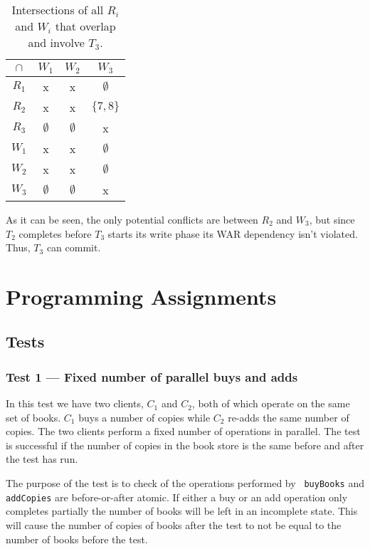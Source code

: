 \documentclass[11pt,a4paper,english]{article}
\begin{document}
\begin{table}[!hbt]
\centering
\begin{tabular}{|c|c|c|c|}
\hline
$\cap$  & $W_{1}$ & $W_{2}$ & $W_{3}$    \\ \hline
$R_{1}$ & x  & x  & $\emptyset$ \\ \hline
$R_{2}$ & x  & x  & $\{7,8\}$ \\ \hline
$R_{3}$ & $\emptyset$ & $\emptyset$ & x \\ \hline
$W_{1}$ & x  & x  & $\emptyset$ \\ \hline
$W_{2}$ & x  & x  & $\emptyset$ \\ \hline
$W_{3}$ & $\emptyset$ & $\emptyset$ & x \\ \hline
\end{tabular}
\caption{Intersections of all $R_{i}$ and $W_{i}$ that overlap and involve $T_{3}$.}
\label{tbl:scenario3}
\end{table}

As it can be seen, the only potential conflicts are between $R_2$ and $W_3$, but
since $T_2$ completes before $T_3$ starts its write phase its WAR dependency
isn't violated. Thus, $T_3$ can commit.

\section{Programming Assignments}
\subsection{Tests}
\subsubsection{Test 1 --- Fixed number of parallel buys and adds}
In this test we have two clients, $C_1$ and $C_2$, both of which operate on the
same set of books. $C_1$ buys a number of copies while $C_2$ re-adds the same
number of copies. The two clients perform a fixed number of operations in
parallel. The test is successful if the number of copies in the book store is
the same before and after the test has run.

The purpose of the test is to check of the operations performed by {\tt
  buyBooks} and {\tt addCopies} are before-or-after atomic. If either a buy or
an add operation only completes partially the number of books will be left in an
incomplete state. This will cause the number of copies of books after the test
to not be equal to the number of books before the test.
\end{document}
